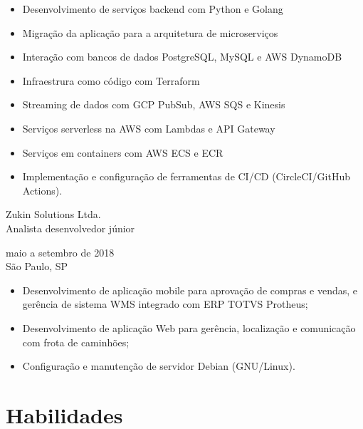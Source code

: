 \documentclass{article}
\begin{document}
\begin{itemize}
    \item Desenvolvimento de serviços backend com Python e Golang
    \item Migração da aplicação para a arquitetura de microserviços
    \item Interação com bancos de dados PostgreSQL, MySQL e AWS DynamoDB
    \item Infraestrura como código com Terraform
    \item Streaming de dados com GCP PubSub, AWS SQS e Kinesis
    \item Serviços serverless na AWS com Lambdas e API Gateway
    \item Serviços em containers com AWS ECS e ECR
    \item Implementação e configuração de ferramentas de CI/CD (CircleCI/GitHub
    Actions).
\end{itemize}

\begin{multicols}{2}
    \noindent
    \begin{flushleft}
        Zukin Solutions Ltda. \\
        Analista desenvolvedor júnior
    \end{flushleft}
    \columnbreak
    \begin{flushright}
        maio a setembro de 2018 \\
        São Paulo, SP
    \end{flushright}
\end{multicols}

\begin{itemize}
    \item Desenvolvimento de aplicação mobile para aprovação de compras e
    vendas, e gerência de sistema WMS integrado com ERP TOTVS Protheus;
    \item Desenvolvimento de aplicação Web para gerência, localização e
    comunicação com frota de caminhões;
    \item Configuração e manutenção de servidor Debian (GNU/Linux).
\end{itemize}

\section{Habilidades}
\end{document}
